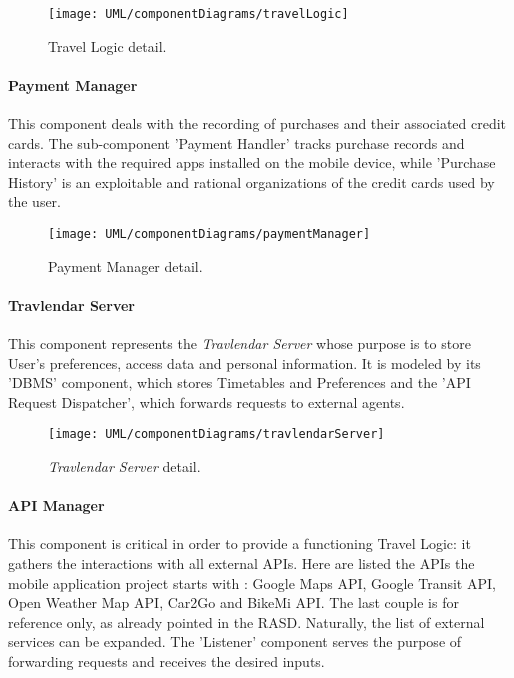 		\begin{figure}[H]
			\centering
			\texttt{[image: UML/componentDiagrams/travelLogic]}
			\caption{Travel Logic detail.}
			\label{travelLogicDetail}
		\end{figure}
	

	\paragraph{Payment Manager}
		This component deals with the recording of purchases and their associated credit cards.
		The sub-component 'Payment Handler' tracks purchase records and interacts with the required apps installed on the mobile device, while 'Purchase History' is an exploitable and rational organizations of the credit cards used by the user.

		\begin{figure}[H]
			\centering
			\texttt{[image: UML/componentDiagrams/paymentManager]}
			\caption{Payment Manager detail.}
			\label{paymentManagerDetail}
		\end{figure}
		
		
	\paragraph{Travlendar Server} 
		This component represents the \textit{Travlendar Server} whose purpose is to store User's preferences, access data and personal information. It is modeled by its 'DBMS' component, which stores Timetables and Preferences and the 'API Request Dispatcher', which forwards requests to external agents.

		\begin{figure}[H]
			\centering
			\texttt{[image: UML/componentDiagrams/travlendarServer]}
			\caption{\textit{Travlendar Server} detail.}
			\label{serverDetail}
		\end{figure}


	\paragraph{API Manager} 
		This component is critical in order to provide a functioning Travel Logic: it gathers the interactions with all external APIs.
		Here are listed the APIs the mobile application project starts with : Google Maps API, Google Transit API, Open Weather Map API, Car2Go and BikeMi API.
		The last couple is for reference only, as already pointed in the RASD. Naturally, the list of external services can be expanded.
		The 'Listener' component serves the purpose of forwarding requests and receives the desired inputs.
	
